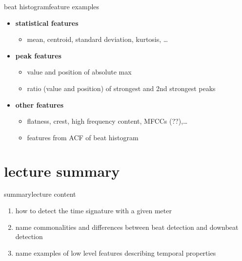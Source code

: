             \begin{frame}{beat histogram}{feature examples}
                
                \begin{itemize}
                    \item	\textbf{statistical features} 
                        \begin{itemize}
                            \item mean, centroid, standard deviation, kurtosis, \ldots
                        \end{itemize}
                    \item<2->   \textbf{peak features}
                        \begin{itemize}
                            \item   value and position of absolute max
                            \item   ratio (value and position) of strongest and 2nd strongest peaks
                        \end{itemize}
                    \item<3->	\textbf{other features}
                        \begin{itemize}
                            \item   flatness, crest, high frequency content, MFCCs (??),\ldots
                            \item   features from ACF of beat histogram
                            
                        \end{itemize}
                        \vfill
                        
                \end{itemize}
            \end{frame}

        \section[summary]{lecture summary}
        \begin{frame}{summary}{lecture content}
            \begin{enumerate}
                \item   how to detect the time signature with a given meter
                \smallskip
                \item<2->   name commonalities and differences between beat detection and downbeat detection
                \smallskip
                \item<3->   name examples of low level features describing temporal properties
            \end{enumerate}
        \end{frame}


